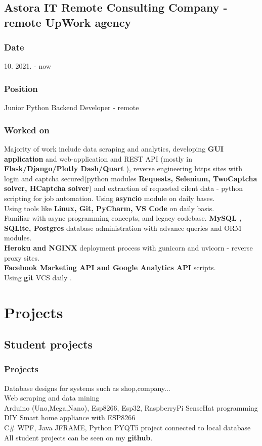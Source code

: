 \documentclass[10pt]{article}
\begin{document}
\subsection{\large{Astora IT Remote Consulting Company - remote UpWork agency}}
\subsubsection{Date}
10. 2021. -  now
\subsubsection{Position}
Junior Python Backend Developer - remote
\subsubsection{Worked on}
Majority of work include data scraping and analytics, developing \textbf{GUI application} and web-application and REST API (mostly in \textbf{ Flask/Django/Plotly Dash/Quart} ), reverse engineering
https sites with login and captcha secured(python modules \textbf{Requests, Selenium, TwoCaptcha solver, HCaptcha solver}) and extraction of requested cilent data - python scripting for job automation. Using \textbf{asyncio} module on daily bases.
\\ Using tools like \textbf{Linux, Git,  PyCharm, VS Code} on daily basis.  \\
Familiar with async programming concepts, and legacy codebase.
\textbf{MySQL , SQLite,  Postgres} database administration with advance queries and ORM modules.\\
\textbf{Heroku and NGINX} deployment process with gunicorn and uvicorn - reverse proxy sites.\\
\textbf{Facebook Marketing API and Google Analytics API} scripts.\\
Using \textbf{git} VCS daily .\\



\section{Projects}
\subsection{\textbf{Student projects}}
\subsubsection{Projects}
Database designs for systems such as shop,company...\\
Web scraping and data mining\\
Arduino (Uno,Mega,Nano), Esp8266, Esp32, RaspberryPi SenseHat programming\\
DIY Smart home appliance with ESP8266 \\
C{\#} WPF, Java JFRAME, Python PYQT5 project connected to local database\\
All student projects can be seen on my \textbf{github}.
 
\end{document}
